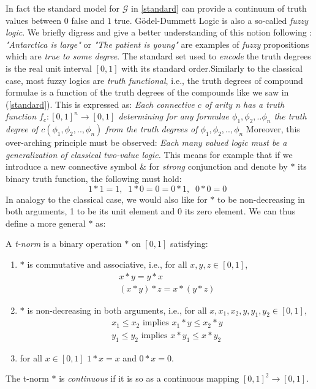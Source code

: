 		 In fact the standard model for $\mathcal{G}$ in \ref{standard} can provide a continuum of truth values between $0$ false and $1$ true. \newline
		 Gödel-Dummett Logic is also a so-called \emph{fuzzy logic}. We briefly digress and give a better understanding of this notion following \cite{metamath}: 
		 \newline \emph{"Antarctica is large"} or \emph{"The patient is young"} are examples of \emph{fuzzy} propositions which are \emph{true to some degree}.\newline
		 The standard set used to \emph{encode} the truth degrees is the real unit interval $[0,1]$ with its standard order.\newline Similarly to the classical case, most fuzzy logics are \emph{truth functional}, i.e., the truth degrees of compound formulae is a function of the truth degrees of the compounds like we saw in (\ref{standard}).\newline
		 This is expressed as: \emph{Each connective $c$ of arity n has a truth function $f_c: [0,1]^n \rightarrow [0,1]$ determining for any formulae $\phi_1,\phi_2,..\phi_n$ the \emph{truth degree} of $c(\phi_1,\phi_2,..,\phi_n)$ from the \emph{truth degrees} of $\phi_1,\phi_2,..,\phi_n$}\newline
		 Moreover, this over-arching principle must be observed: 
		 \emph{Each many valued logic must be a generalization of classical two-value logic.} 
\newline This means for example that if we introduce a new connective symbol \& for \emph{strong} conjunction and denote by $*$ its binary truth function, the following must hold: \[1 * 1 = 1, \;\; 1 * 0 = 0 = 0 * 1, \;\; 0*0 = 0 \;\; \]
In analogy to the classical case, we would also like for $*$ to be non-decreasing in both arguments, 1 to be its unit element and 0 its zero element. We can thus define a more general $*$ as:
\begin{definition}[t-norm]
	A \emph{t-norm} is a binary operation $*$ on $[0,1]$ satisfying:
	\begin{enumerate}[label=(\roman*)]
		\item $*$ is commutative and associative, i.e., for all $x,y,z\in [0,1]$,
		\begin{gather*}
			x * y = y * x \\
			(x * y) * z = x * (y * z)
		\end{gather*}
		\item $*$ is non-decreasing in both arguments, i.e., \newline
		for all $x,x_1,x_2,y,y_1,y_2\in [0,1]$,
		\begin{gather*}
			x_1 \leq x_2 \text{ implies } x_1 * y \leq x_2 * y \\
			y_1 \leq y_2 \text{ implies } x * y_1 \leq x * y_2
		\end{gather*}
		\item for all $x \in [0,1]$ $1*x=x$ and $0*x=0$.		
	\end{enumerate}
	The t-norm $*$ is \emph{continuous} if it is so as a continuous mapping $[0,1]^2 \rightarrow [0,1]$. 
\end{definition}

